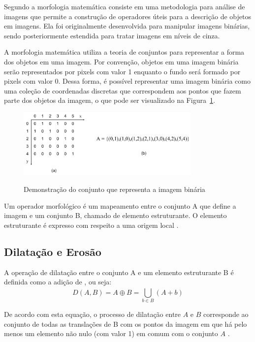 \documentclass[12pt,oneside,a4paper,english,french,spanish,brazil,]{abntex2}
\begin{document}
Segundo \citet{pedrini:2008} a morfologia matemática consiste em uma metodologia para análise de imagens que permite a construção de operadores úteis para a descrição de objetos em imagens. Ela foi originalmente desenvolvida para manipular imagens binárias, sendo posteriormente estendida para tratar imagens em níveis de cinza.

A morfologia matemática utiliza a teoria de conjuntos para representar a forma dos objetos em uma imagem. Por convenção, objetos em uma imagem binária serão representados por pixels com valor 1 enquanto o fundo será formado por pixels com valor 0. Dessa forma, é possível representar uma imagem binária como uma coleção de coordenadas discretas que correspondem aos pontos que fazem parte dos objetos da imagem, o que pode ser visualizado na Figura~\ref{fig:PDI_Conjunto}.

\begin{figure}[ht]
\centering
\caption{Demonstração do conjunto que representa a imagem binária}
\includegraphics[width=0.8\textwidth]{imagens/PDI_Conjunto.pdf}
\label{fig:PDI_Conjunto}
\end{figure}

Um operador morfológico é um mapeamento entre o conjunto A que define a imagem e um conjunto B, chamado de elemento estruturante. O elemento estruturante é expresso com respeito a uma origem local \cite{pedrini:2008}.

\subsection{Dilatação e Erosão}

A operação de dilatação entre o conjunto A e um elemento estruturante B é definida como a adição de \citet{minkowski:1911}, ou seja: \[D(A,B)=A\oplus B=\bigcup_{b\in B}^{ } (A+b)\]

De acordo com esta equação, o processo de dilatação entre \(A\) e \(B\) corresponde ao conjunto de todas as translações de B com os pontos da imagem em que há pelo menos um elemento não nulo (com valor 1) em comum com o conjunto \(A\) \cite{pedrini:2008}. 
\end{document}
